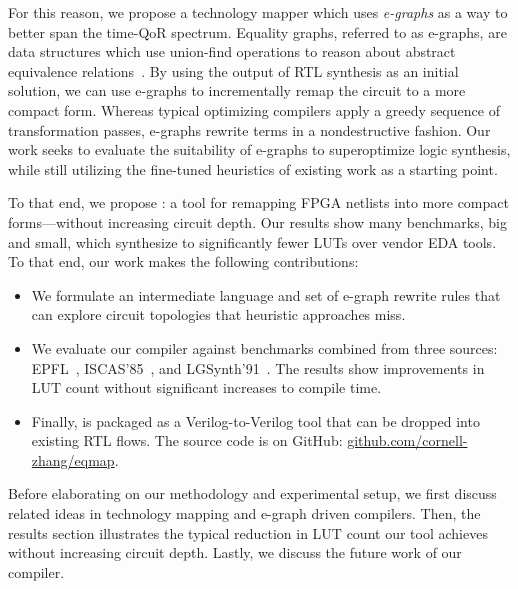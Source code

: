 For this reason, we propose a technology mapper which uses \textit{e-graphs} as
a way to better span the time-QoR spectrum. Equality graphs, referred to as
e-graphs, are data structures which use union-find operations to reason about
abstract equivalence relations~\cite{eggpaper}. By using the output of RTL
synthesis as an initial solution, we can use e-graphs to incrementally remap
the circuit to a more compact form. Whereas typical optimizing compilers apply
a greedy sequence of transformation passes, e-graphs rewrite terms in a
nondestructive fashion. Our work seeks to evaluate the suitability of e-graphs
to superoptimize logic synthesis, while still utilizing the fine-tuned
heuristics of existing work as a starting point.

To that end, we propose \shortname{}: a tool for remapping FPGA netlists into
more compact forms---without increasing circuit depth. Our results show many
benchmarks, big and small, which synthesize to significantly fewer LUTs over
vendor EDA tools. To that end, our work makes the following contributions:

\begin{itemize}
    \item We formulate an intermediate language and set of e-graph rewrite rules that can
          explore circuit topologies that heuristic approaches miss.
    \item We evaluate our compiler against \nbenchmarks{} benchmarks combined from three
          sources: EPFL~\cite{epflbench}, ISCAS'85~\cite{iscasbench}, and
          LGSynth'91~\cite{lgsynthbench}. The results show improvements in LUT count
          without significant increases to compile time.
    \item Finally, \shortname{} is packaged as a Verilog-to-Verilog tool that can be
          dropped into existing RTL flows. The source code is on GitHub:
          \href{https://github.com/cornell-zhang/eqmap}{github.com/cornell-zhang/eqmap}.
\end{itemize}

Before elaborating on our methodology and experimental setup, we first discuss
related ideas in technology mapping and e-graph driven compilers. Then, the
results section illustrates the typical reduction in LUT count our tool
achieves without increasing circuit depth. Lastly, we discuss the future work
of our compiler.